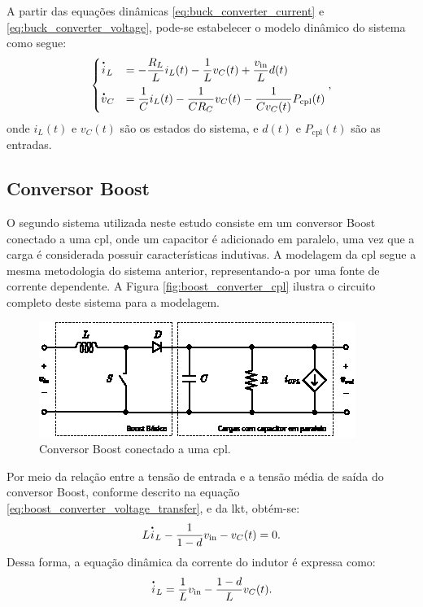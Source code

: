 A partir das equações dinâmicas \eqref{eq:buck_converter_current} e \eqref{eq:buck_converter_voltage}, pode-se estabelecer o modelo dinâmico do sistema como segue: \begin{equation}\begin{cases} \dt{i}_L &= \displaystyle - \frac{R_L}{L} i_L(t) - \frac{1}{L} v_C(t) + \frac{v_{\mathrm{in}}}{L}d(t)  \\[8pt] \dt{v}_C &= \displaystyle \frac{1}{C} i_L(t) - \frac{1}{C R_C} v_C(t) - \frac{1}{C v_C(t)} P_{\mathrm{cpl}}(t) \label{eq:buck_nonlinear_system} \end{cases}, \end{equation} onde $i_L(t)$ e $v_C(t)$ são os estados do sistema, e $d(t)$ e $P_{\mathrm{cpl}}(t)$ são as entradas.

\subsection{Conversor Boost}

O segundo sistema utilizada neste estudo consiste em um conversor Boost conectado a uma \acrshort{cpl}, onde um capacitor é adicionado em paralelo, uma vez que a carga é considerada possuir características indutivas. A modelagem da \acrshort{cpl} segue a mesma metodologia do sistema anterior, representando-a por uma fonte de corrente dependente. A Figura \autoref{fig:boost_converter_cpl} ilustra o circuito completo deste sistema para a modelagem.

\begin{figure}[H]
  \centering
  \includegraphics[width=.73\textwidth]{figuras/boost_converter_cpl.eps}
  \caption{Conversor Boost conectado a uma \acrshort{cpl}.}
  \label{fig:boost_converter_cpl}
\end{figure}

Por meio da relação entre a tensão de entrada e a tensão média de saída do conversor Boost, conforme descrito na equação \eqref{eq:boost_converter_voltage_transfer}, e da \acrshort{lkt}, obtém-se: \begin{equation} L \dt{i}_L - \frac{1}{1-d} v_{\mathrm{in}} - v_C(t) = 0. \end{equation} Dessa forma, a equação dinâmica da corrente do indutor é expressa como: \begin{equation} \dt{i}_L = \frac{1}{L}v_{\mathrm{in}} - \frac{1-d}{L}v_C(t) \label{eq:boost_converter_current}. \end{equation}

